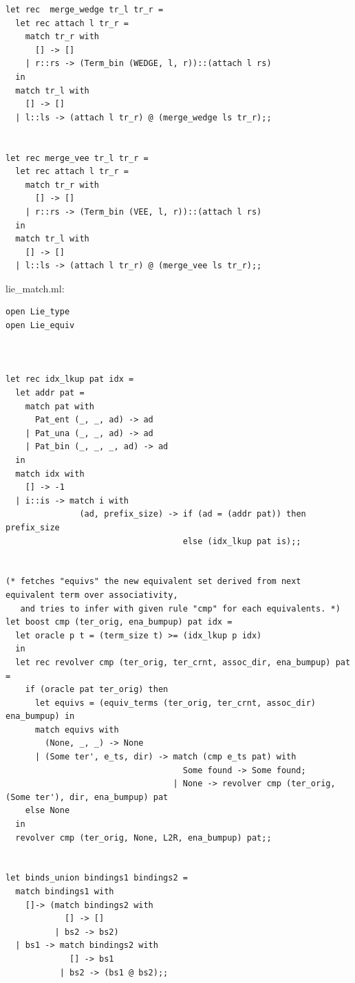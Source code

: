 \documentclass[12pt]{article}
\begin{document}
\begin{tiny}
\begin{verbatim}
let rec  merge_wedge tr_l tr_r =
  let rec attach l tr_r =
    match tr_r with
      [] -> []
    | r::rs -> (Term_bin (WEDGE, l, r))::(attach l rs)
  in
  match tr_l with
    [] -> []
  | l::ls -> (attach l tr_r) @ (merge_wedge ls tr_r);;


let rec merge_vee tr_l tr_r =
  let rec attach l tr_r =
    match tr_r with
      [] -> []
    | r::rs -> (Term_bin (VEE, l, r))::(attach l rs)
  in
  match tr_l with
    [] -> []
  | l::ls -> (attach l tr_r) @ (merge_vee ls tr_r);;
\end{verbatim}
\end{tiny}


\pagebreak
lie\_match.ml:
\begin{tiny}
\begin{verbatim}
open Lie_type
open Lie_equiv



let rec idx_lkup pat idx =
  let addr pat =
    match pat with
      Pat_ent (_, _, ad) -> ad
    | Pat_una (_, _, ad) -> ad
    | Pat_bin (_, _, _, ad) -> ad
  in
  match idx with
    [] -> -1
  | i::is -> match i with
               (ad, prefix_size) -> if (ad = (addr pat)) then prefix_size 
                                    else (idx_lkup pat is);;


(* fetches "equivs" the new equivalent set derived from next equivalent term over associativity,
   and tries to infer with given rule "cmp" for each equivalents. *)
let boost cmp (ter_orig, ena_bumpup) pat idx =
  let oracle p t = (term_size t) >= (idx_lkup p idx)
  in
  let rec revolver cmp (ter_orig, ter_crnt, assoc_dir, ena_bumpup) pat =
    if (oracle pat ter_orig) then    
      let equivs = (equiv_terms (ter_orig, ter_crnt, assoc_dir) ena_bumpup) in
      match equivs with
        (None, _, _) -> None
      | (Some ter', e_ts, dir) -> match (cmp e_ts pat) with
                                    Some found -> Some found;
                                  | None -> revolver cmp (ter_orig, (Some ter'), dir, ena_bumpup) pat
    else None
  in
  revolver cmp (ter_orig, None, L2R, ena_bumpup) pat;;


let binds_union bindings1 bindings2 =
  match bindings1 with
    []-> (match bindings2 with
            [] -> []
          | bs2 -> bs2)
  | bs1 -> match bindings2 with
             [] -> bs1
           | bs2 -> (bs1 @ bs2);;



\end{verbatim}
\end{tiny}
\end{document}
